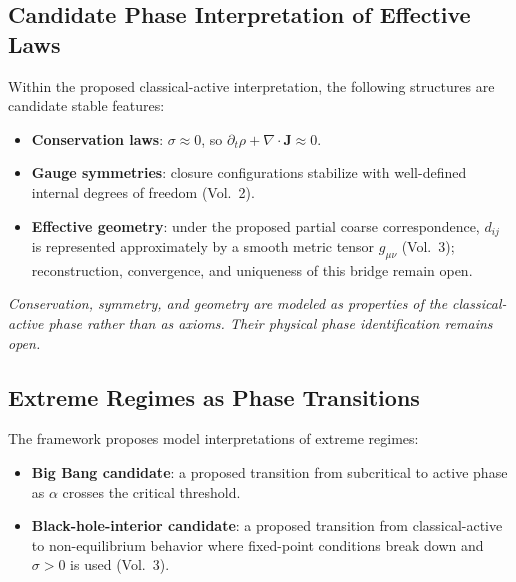 \subsection{Candidate Phase Interpretation of Effective Laws}

Within the proposed classical-active interpretation, the following structures
are candidate stable features:

\begin{itemize}
  \item \textbf{Conservation laws}: $\sigma \approx 0$, so
    $\partial_t\rho + \nabla\cdot\mathbf{J} \approx 0$.
  \item \textbf{Gauge symmetries}: closure configurations stabilize with
    well-defined internal degrees of freedom (Vol.~2).
  \item \textbf{Effective geometry}: under the proposed partial coarse
    correspondence, $d_{ij}$ is represented approximately by a smooth metric
    tensor $g_{\mu\nu}$ (Vol.~3); reconstruction, convergence, and uniqueness
    of this bridge remain open.
\end{itemize}

\begin{keybox}
\textit{Conservation, symmetry, and geometry are modeled as properties of the
classical-active phase rather than as axioms. Their physical phase
identification remains open.}
\end{keybox}

\subsection{Extreme Regimes as Phase Transitions}

The framework proposes model interpretations of extreme regimes:

\begin{itemize}
  \item \textbf{Big Bang candidate}: a proposed transition from subcritical to
    active phase as $\alpha$ crosses the critical threshold.
  \item \textbf{Black-hole-interior candidate}: a proposed transition from
    classical-active to non-equilibrium behavior where fixed-point conditions
    break down and $\sigma>0$ is used (Vol.~3).
\end{itemize}

